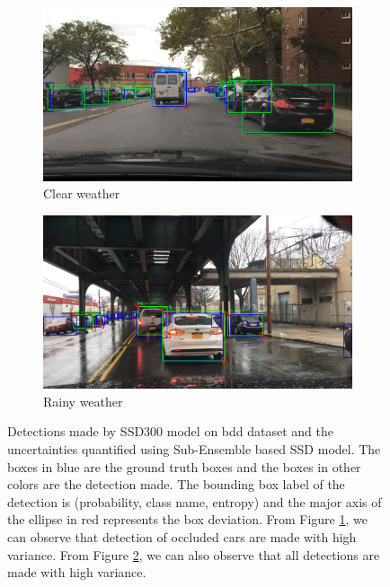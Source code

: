     \begin{figure}[H]
        \centering
        \begin{subfigure}[t]{\textwidth}
    		\centering
    		\includegraphics[scale=0.45]{images/detections/uncertainty_vis/UQ_gt_Viz.png}
    		\caption{Clear weather}
    		\label{clear_weather}
    	\end{subfigure}
    	\begin{subfigure}[t]{\textwidth}
    		\centering
    		\includegraphics[scale=0.45]{images/detections/uncertainty_vis/UQ_gt_Viz_2.png}
    		\caption{Rainy weather}
    		\label{rainy_weather}
    	\end{subfigure}
        \caption[Detection on image from \acrshort{bdd} detection with uncertainty]{Detections made by SSD300 model on \acrshort{bdd} dataset and the uncertainties quantified using Sub-Ensemble based SSD model. The boxes in blue are the ground truth boxes and the boxes in other colors are the detection made. The bounding box label of the detection is (probability, class name, entropy) and the major axis of the ellipse in red represents the box deviation. From Figure \ref{clear_weather}, we can observe that detection of occluded cars are made with high variance. From Figure \ref{rainy_weather}, we can also observe that all detections are made with high variance.}
        \label{fig:uq_det_bdd}
    \end{figure}
    
